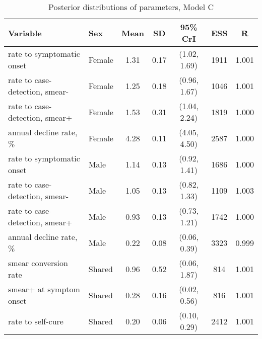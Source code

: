 \begin{table}[h]

\caption{\label{tab:}Posterior distributions of parameters, Model C}
\centering
\begin{tabular}[t]{llccccc}
\toprule
Variable & Sex & Mean & SD & 95\% CrI & ESS & \^{R}\\
\midrule
rate to symptomatic onset & Female & 1.31 & 0.17 & (1.02, 1.69) & 1911 & 1.001\\
rate to case-detection, smear- & Female & 1.25 & 0.18 & (0.96, 1.67) & 1046 & 1.001\\
rate to case-detection, smear+ & Female & 1.53 & 0.31 & (1.04, 2.24) & 1819 & 1.000\\
annual decline rate, \% & Female & 4.28 & 0.11 & (4.05, 4.50) & 2587 & 1.000\\
\addlinespace
rate to symptomatic onset & Male & 1.14 & 0.13 & (0.92, 1.41) & 1686 & 1.000\\
rate to case-detection, smear- & Male & 1.05 & 0.13 & (0.82, 1.33) & 1109 & 1.003\\
rate to case-detection, smear+ & Male & 0.93 & 0.13 & (0.73, 1.21) & 1742 & 1.000\\
annual decline rate, \% & Male & 0.22 & 0.08 & (0.06, 0.39) & 3323 & 0.999\\
\addlinespace
smear conversion rate & Shared & 0.96 & 0.52 & (0.06, 1.87) & 814 & 1.001\\
smear+ at symptom onset & Shared & 0.28 & 0.16 & (0.02, 0.56) & 816 & 1.001\\
rate to self-cure & Shared & 0.20 & 0.06 & (0.10, 0.29) & 2412 & 1.001\\
\bottomrule
\end{tabular}
\end{table}
